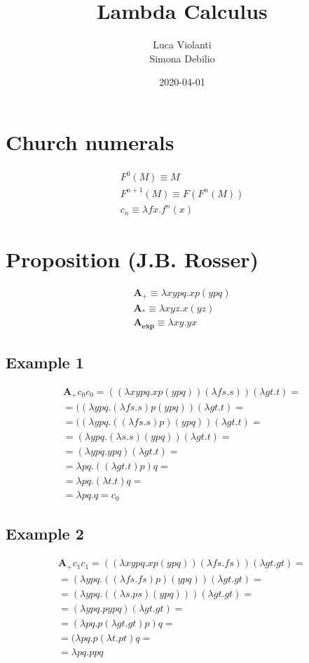 \documentclass[11pt]{article}
\title{\textbf{Lambda Calculus}}
\author{Luca Violanti\\
		Simona Debilio}
\date{2020-04-01}
\begin{document}
\maketitle

\section*{Church numerals}

\begin{gather*}
F^{0} (M) \equiv M \\
F^{n+1}(M) \equiv F(F^{n}(M)) \\
c_{n} \equiv \lambda fx.f^{n}(x)
\end{gather*}

\section*{Proposition (J.B. Rosser)}
\begin{gather*}
\mathbf{A_{+}} \equiv \lambda xypq.xp(ypq) \\
\mathbf{A_{*}} \equiv \lambda xyz.x(yz) \\
\mathbf{A_{exp}} \equiv \lambda xy.yx
\end{gather*}

\subsection*{Example 1}
\begin{gather*}
\mathbf{A_{+}} c_{0} c_{0} = ((\lambda xypq.xp(ypq)) (\lambda fs.s)) (\lambda gt.t) = \\
= ((\lambda ypq.(\lambda fs.s)p(ypq)) (\lambda gt.t) = \\
= ((\lambda ypq.((\lambda fs.s)p)(ypq)) (\lambda gt.t) = \\
= (\lambda ypq. (\lambda s.s) (ypq)) (\lambda gt.t) = \\
= (\lambda ypq. ypq) (\lambda gt.t) = \\
= \lambda pq. ((\lambda gt.t)p)q = \\
= \lambda pq. (\lambda t.t)q = \\
= \lambda pq. q = c_0
\end{gather*}


\subsection*{Example 2}
\begin{gather*}
\mathbf{A_{+}} c_{1}c_{1} = ((\lambda xypq.xp(ypq)) (\lambda fs.fs)) (\lambda gt.gt) = \\
= (\lambda ypq.((\lambda fs.fs)p)(ypq)) (\lambda gt.gt) = \\
= (\lambda ypq.((\lambda s.ps)(ypq))) (\lambda gt.gt) = \\
= (\lambda ypq.pypq) (\lambda gt.gt) = \\
= (\lambda pq.p (\lambda gt.gt)p)q = \\
= (\lambda pq.p (\lambda t.pt)q = \\
= \lambda pq.ppq 
\end{gather*}
\end{document}
